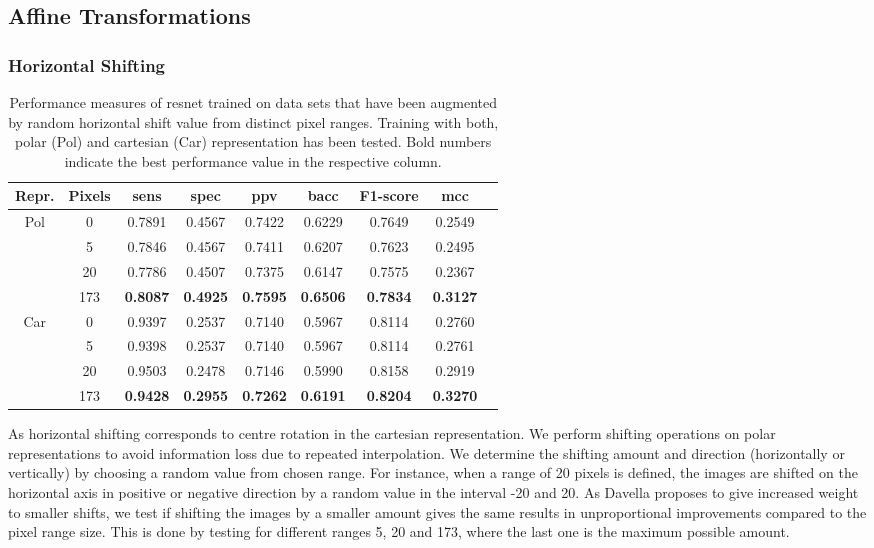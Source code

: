 \subsection{Affine Transformations}

\subsubsection{Horizontal Shifting}

\begin{table}[H]
    \centering
    \begin{tabular}{|c|c|c|c|c|c|c|c|c|}
        \hline
        Repr. & Pixels & \acrshort{sens} & \acrshort{spec} & \acrshort{ppv} & \acrshort{bacc} & F1-score & \acrshort{mcc} \\\hline\hline
        \multirow{4}{2em}{Pol} & 0 & 0.7891 & 0.4567 & 0.7422 & 0.6229 & 0.7649 & 0.2549 \\
         & 5 & 0.7846 & 0.4567 & 0.7411 & 0.6207 & 0.7623 & 0.2495 \\
         & 20 & 0.7786 & 0.4507 & 0.7375 & 0.6147 & 0.7575 & 0.2367 \\
         & 173 & \textbf{0.8087} & \textbf{0.4925} & \textbf{0.7595} & \textbf{0.6506} & \textbf{0.7834} & \textbf{0.3127} \\
        \hline
        \multirow{4}{2em}{Car} & 0 & 0.9397 & 0.2537 & 0.7140 & 0.5967 & 0.8114 & 0.2760 \\
         & 5 & 0.9398 & 0.2537 & 0.7140 & 0.5967 & 0.8114 & 0.2761 \\
         & 20 & 0.9503 & 0.2478 & 0.7146 & 0.5990 & 0.8158 & 0.2919 \\
         & 173  & \textbf{0.9428} & \textbf{0.2955} & \textbf{0.7262} & \textbf{0.6191} & \textbf{0.8204} & \textbf{0.3270} \\
        \hline
    \end{tabular}
    \caption[Horizontal shifting and rotation]{Performance measures of \acrshort{resnet} trained on data sets that have been augmented by random horizontal shift value from distinct pixel ranges. Training with both, polar (Pol) and cartesian (Car) representation has been tested. Bold numbers indicate the best performance value in the respective column.}
    \label{tab:da_results1}
\end{table}
As horizontal shifting corresponds to centre rotation in the cartesian representation. We perform shifting operations on polar representations to avoid information loss due to repeated interpolation. We determine the shifting amount and direction (horizontally or vertically) by choosing a random value from chosen range. For instance, when a range of 20 pixels is defined, the images are shifted on the horizontal axis in positive or negative direction by a random value in the interval -20 and 20. As Davella \cite{Devalla.2018} proposes to give increased weight to smaller shifts, we test if shifting the images by a smaller amount gives the same results in unproportional improvements compared to the pixel range size. This is done by testing for different ranges 5, 20 and 173, where the last one is the maximum possible amount.

